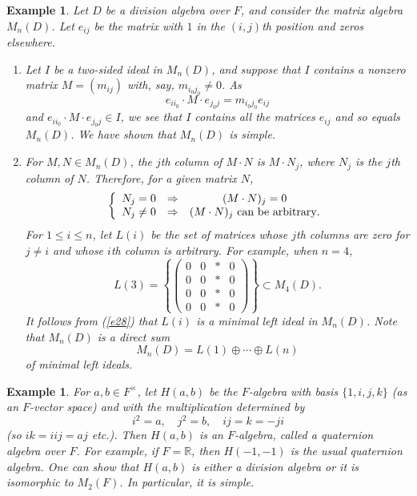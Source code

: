 \documentclass[a4paper,11pt,final]{memoir}%
\newtheorem{example}[X]{Example}
\theoremstyle{nonumberplain}
\begin{document}
\begin{example}
\label{r11}Let $D$ be a division algebra over $F$, and consider the matrix
algebra $M_{n}(D)$. Let $e_{ij}$ be the matrix with $1$ in the $(i,j)$th
position and zeros elsewhere.

\begin{enumerate}
\item Let $I{}$ be a two-sided ideal in $M_{n}(D)$, and suppose that $I{}$
contains a nonzero matrix $M=(m_{ij})$ with, say, $m_{i_{0}j_{0}}\neq0$. As%
\[
e_{ii_{0}}\cdot M\cdot e_{j_{0}j}=m_{i_{0}j_{0}}e_{ij}%
\]
and $e_{ii_{0}}\cdot M\cdot e_{j_{0}j}\in I$, we see that $I{}$ contains all
the matrices $e_{ij}$ and so equals $M_{n}(D)$. We have shown that $M_{n}(D)$
is simple.

\item For $M,N\in M_{n}(D)$, the $j$th column of $M\cdot N$ is $M\cdot N_{j}$,
where $N_{j}$ is the $j$th column of $N$. Therefore, for a given matrix $N$,%
\begin{equation}
\left\{
\begin{array}
[c]{ccc}%
N_{j}=0 & \Rightarrow & (M\cdot N)_{j}=0\\
N_{j}\neq0 & \Rightarrow & (M\cdot N)_{j}\text{ can be arbitrary}.
\end{array}
\right.  \label{e28}%
\end{equation}
For $1\leq i\leq n$, let $L(i)$ be the set of matrices whose $j$th columns are
zero for $j\neq i$ and whose $i$th column is arbitrary. For example, when
$n=4$,%
\[
L(3)=\left\{
\begin{pmatrix}
0 & 0 & \ast & 0\\
0 & 0 & \ast & 0\\
0 & 0 & \ast & 0\\
0 & 0 & \ast & 0
\end{pmatrix}
\right\}  \subset M_{4}(D).
\]
It follows from (\ref{e28}) that $L(i)$ is a minimal left ideal in $M_{n}(D)$.
Note that $M_{n}(D)$ is a direct sum%
\[
M_{n}(D)=L(1)\oplus\cdots\oplus L(n)
\]
of minimal left ideals.
\end{enumerate}
\end{example}

\begin{example}
\label{r13}For $a,b\in F^{\times}$, let $H(a,b)$ be the $F$-algebra with basis
$\{1,i,j,k\}$ (as an $F$-vector space) and with the multiplication determined
by%
\[
i^{2}=a,\quad j^{2}=b,\quad ij=k=-ji
\]
(so $ik=iij=aj$ etc.). Then $H(a,b)$ is an $F$-algebra, called a
\emph{quaternion algebra\/}%
over $F$. For example, if $F=\mathbb{R}$, then $H(-1,-1)$ is the usual
quaternion algebra. One can show that $H(a,b)$ is either a division algebra or
it is isomorphic to $M_{2}(F)$. In particular, it is simple.
\end{example}
\end{document}
